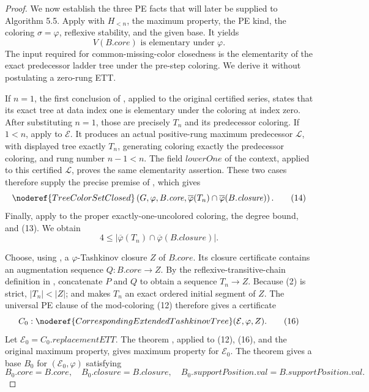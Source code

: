 \begin{proof}
We now establish the three PE facts that will later be supplied to Algorithm
5.5.  Apply  with
\(H_{<n}\), the maximum property, the PE kind, the coloring
\(\sigma=\varphi\), reflexive stability, and the given base.  It yields
\[
 V(B.\mathit{core})\text{ is elementary under }\varphi.          \tag{13}
\]
The input required for common-missing-color closedness is the elementarity of
the exact predecessor ladder tree under the pre-step coloring.  We derive it
without postulating a zero-rung ETT.

If \(n=1\), the first conclusion of , applied
to the original certified series, states that its exact tree at data index
one is elementary under the coloring at index zero.  After substituting
\(n=1\), those are precisely \(T_n\) and its predecessor coloring.  If
\(1<n\), apply  to \(\mathcal E\).  It
produces an actual positive-rung maximum predecessor \(\mathcal L\), with
displayed tree exactly \(T_n\), generating coloring exactly the predecessor
coloring, and rung number \(n-1<n\).  The field
\(\mathit{lowerOne}\) of the context, applied to this certified
\(\mathcal L\), proves the same elementarity assertion.  These two cases
therefore supply the precise premise of ,
which gives
\[
 \noderef{TreeColorSetClosed}\left(
   G,\varphi,B.\mathit{core},
   \overline\varphi(T_n)\cap
     \overline\varphi(B.\mathit{closure})\right).                \tag{14}
\]
Finally, apply  to the proper
exactly-one-uncolored coloring, the degree bound, and (13).  We obtain
\[
 4\leq\left|\overline\varphi(T_n)\cap
              \overline\varphi(B.\mathit{closure})\right|.       \tag{15}
\]

Choose, using , a
\(\varphi\)-Tashkinov closure \(Z\) of \(B.\mathit{core}\).  Its closure
certificate contains an augmentation sequence
\(Q:B.\mathit{core}\longrightarrow Z\).  By the reflexive-transitive-chain
definition in , concatenate \(P\) and
\(Q\) to obtain a sequence \(T_n\longrightarrow Z\).  Because (2) is strict,
\(|T_n|<|Z|\); and
 makes \(T_n\) an exact
ordered initial segment of \(Z\).  The universal PE clause of the
mod-coloring (12) therefore gives a certificate
\[
 C_0:\noderef{CorrespondingExtendedTashkinovTree}
        (\mathcal E,\varphi,Z).                                  \tag{16}
\]
Let \(\mathcal E_0=C_0.\mathit{replacementETT}\).  The theorem
, applied to (12), (16), and the original
maximum property, gives maximum property for \(\mathcal E_0\).
The theorem  gives a base
\(B_0\) for \((\mathcal E_0,\varphi)\) satisfying
\[
 B_0.\mathit{core}=B.\mathit{core},\quad
 B_0.\mathit{closure}=B.\mathit{closure},\quad
 B_0.\mathit{supportPosition.val}=B.\mathit{supportPosition.val}. \tag{17}
\]


\end{proof}
